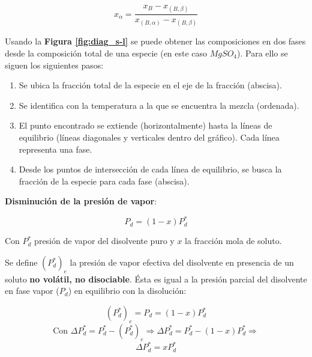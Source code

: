             \begin{equation}
            \label{eq:regla_palanca}
                x_{\alpha} = \frac{x_{B} - x_{(B, \beta)}}{x_{(B, \alpha)} - x_{(B, \beta)}}
            \end{equation}
            
            Usando la \textbf{Figura \ref{fig:diag_s-l}} se puede obtener las composiciones en dos fases desde la composición total de una especie (en este caso \(MgS{O}_{4}\)). Para ello se siguen los siguientes pasos:
            
            \begin{enumerate}
                \item Se ubica la fracción total de la especie en el eje de la fracción (abscisa).
                \item Se identifica con la temperatura a la que se encuentra la mezcla (ordenada).
                \item El punto encontrado se extiende (horizontalmente) hasta la líneas de equilibrio (líneas diagonales y verticales dentro del gráfico). Cada línea representa una fase.
                \item Desde los puntos de intersección de cada línea de equilibrio, se busca la fracción de la especie para cada fase (abscisa).
            \end{enumerate}
            
            
            \textbf{Disminución de la presión de vapor}:
            
            \[P_{d} = \left ( 1 - x \right ) P_{d}^{*}\]
            
            Con \(P_{d}^{*}\) presión de vapor del disolvente puro y \(x\) la fracción mola de soluto.
            
            Se define \(\left ( P_{d}^{*} \right )_{e}\) la presión de vapor efectiva del disolvente en presencia de un soluto \textbf{no volátil, no disociable}. Ésta es igual a la presión parcial del disolvente en fase vapor (\(P_{d}\)) en equilibrio con la disolución:
            
            \[\left ( P_{d}^{*} \right )_{e} = P_{d} = \left ( 1 - x \right ) P_{d}^{*}\]
            \[\text{Con }\Delta P_{d}^{*} = P_{d}^{*} - \left ( P_{d}^{*} \right )_{e} \Rightarrow \Delta P_{d}^{*} = P_{d}^{*} - \left ( 1 - x \right ) P_{d}^{*} \Rightarrow\]
            \begin{equation}
            \label{eq:dis_presion_vapor}
                \Delta P_{d}^{*} = x P_{d}^{*}
            \end{equation}
            
